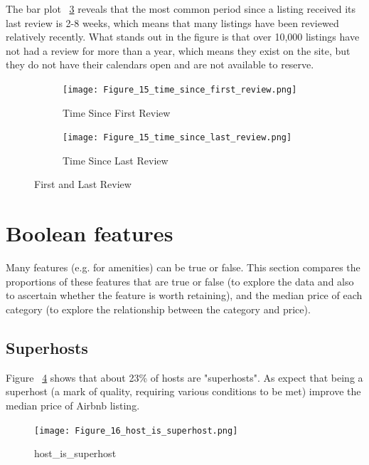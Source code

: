 The bar plot ~\ref{fig:time_since_last_review} reveals that the most
common period since a listing received its last review is 2-8 weeks, which means
that many listings have been reviewed relatively recently.  What stands out in
the figure is that over 10,000 listings have not had a review for more than a
year, which means they exist on the site, but they do not have their calendars
open and are not available to reserve.

\begin{figure}[H]
    \centering
    \begin{subfigure}[b]{0.48\textwidth}
        \centering
        \caption{Time Since First Review}
        \texttt{[image: Figure\_15\_time\_since\_first\_review.png]}
        \label{fig:time_since_first_review}
    \end{subfigure}
    \begin{subfigure}[b]{0.48\textwidth}
        \centering
        \caption{Time Since Last Review}
        \texttt{[image: Figure\_15\_time\_since\_last\_review.png]}
        \label{fig:time_since_last_review}
    \end{subfigure}
    \caption{First and Last Review}
\end{figure}

\section{Boolean features}
\label{sec:boolean_features}

Many features (e.g. for amenities) can be true or false. This section compares
the proportions of these features that are true or false (to explore the data
and also to ascertain whether the feature is worth retaining), and the median
price of each category (to explore the relationship between the category and
price).

\subsection{Superhosts}

Figure ~\ref{fig:host_is_superhost} shows that about 23\% of hosts are "superhosts". As expect that being a superhost (a
mark of quality, requiring various conditions to be met)  improve the median
price of Airbnb listing.

\begin{figure}[H]\centering
    \texttt{[image: Figure\_16\_host\_is\_superhost.png]}
    \caption{host\_is\_superhost}
    \label{fig:host_is_superhost}
\end{figure}


